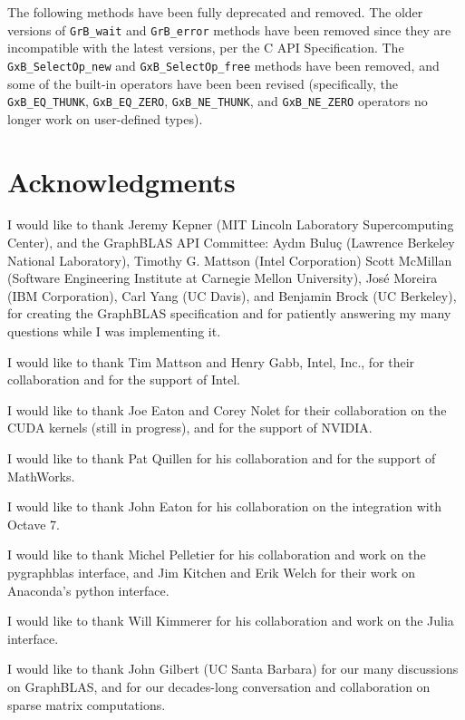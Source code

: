 \documentclass[12pt]{article}
\begin{document}
The following methods have been fully deprecated and removed.  The older
versions of \verb'GrB_wait' and \verb'GrB_error' methods have been removed
since they are incompatible with the latest versions, per the C API
Specification.  The \verb'GxB_SelectOp_new' and \verb'GxB_SelectOp_free'
methods have been removed, and some of the built-in operators have been been
revised (specifically, the \verb'GxB_EQ_THUNK', \verb'GxB_EQ_ZERO',
\verb'GxB_NE_THUNK', and \verb'GxB_NE_ZERO' operators no longer work on
user-defined types).

\section{Acknowledgments}

I would like to thank Jeremy Kepner (MIT Lincoln Laboratory Supercomputing
Center), and the GraphBLAS API Committee: Ayd\i n Bulu\c{c} (Lawrence Berkeley
National Laboratory), Timothy G. Mattson (Intel Corporation) Scott McMillan
(Software Engineering Institute at Carnegie Mellon University), Jos\'e Moreira
(IBM Corporation), Carl Yang (UC Davis), and Benjamin Brock (UC Berkeley), for
creating the GraphBLAS specification and for patiently answering my many
questions while I was implementing it.

I would like to thank Tim Mattson and Henry Gabb, Intel, Inc., for their
collaboration and for the support of Intel.

I would like to thank Joe Eaton and Corey Nolet for their collaboration on the
CUDA kernels (still in progress), and for the support of NVIDIA.

I would like to thank Pat Quillen for his
collaboration and for the support of MathWorks.

I would like to thank John Eaton for his collaboration on the integration
with Octave 7.

I would like to thank Michel Pelletier for his collaboration and work on the
pygraphblas interface, and Jim Kitchen and Erik Welch for their work on
Anaconda's python interface.

I would like to thank Will Kimmerer for his collaboration and work on the
Julia interface.

I would like to thank John Gilbert (UC Santa Barbara) for our many discussions
on GraphBLAS, and for our decades-long conversation and collaboration on sparse
matrix computations.
\end{document}
